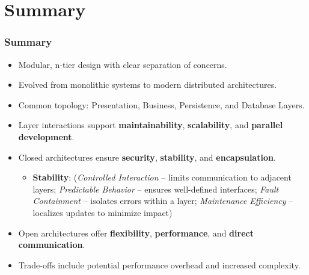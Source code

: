 \documentclass[aspectratio=169, table]{beamer}
\begin{document}
\section{Summary}
\begin{frame}
	\frametitle{Summary}
	\begin{itemize}
		\item Modular, n-tier design with clear separation of concerns.
		\item Evolved from monolithic systems to modern distributed architectures.
		\item Common topology: Presentation, Business, Persistence, and Database Layers.
		\item Layer interactions support \textbf{maintainability}, \textbf{scalability}, and \textbf{parallel development}.
		\item Closed architectures ensure \textbf{security}, \textbf{stability}, and \textbf{encapsulation}.
			\begin{itemize}
				\item \textbf{Stability}: (\textit{Controlled Interaction} – limits communication to adjacent layers; \textit{Predictable Behavior} – ensures well-defined interfaces; \textit{Fault Containment} – isolates errors within a layer; \textit{Maintenance Efficiency} – localizes updates to minimize impact)
			\end{itemize}
		\item Open architectures offer \textbf{flexibility}, \textbf{performance}, and \textbf{direct communication}.
		\item Trade-offs include potential performance overhead and increased complexity.
	\end{itemize}
\end{frame}
\end{document}

